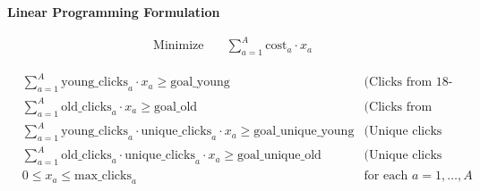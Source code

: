 \documentclass{article}
\begin{document}
\textbf{Linear Programming Formulation}

\begin{align*}
\text{Minimize} \quad & \sum_{a=1}^{A} \text{cost}_a \cdot x_a
\end{align*}

\begin{align*}
& \sum_{a=1}^{A} \text{young\_clicks}_a \cdot x_a \geq \text{goal\_young} & \text{(Clicks from 18-25)} \\
& \sum_{a=1}^{A} \text{old\_clicks}_a \cdot x_a \geq \text{goal\_old} & \text{(Clicks from 25+)} \\
& \sum_{a=1}^{A} \text{young\_clicks}_a \cdot \text{unique\_clicks}_a \cdot x_a \geq \text{goal\_unique\_young} & \text{(Unique clicks from 18-25)} \\
& \sum_{a=1}^{A} \text{old\_clicks}_a \cdot \text{unique\_clicks}_a \cdot x_a \geq \text{goal\_unique\_old} & \text{(Unique clicks from 25+)} \\
& 0 \leq x_a \leq \text{max\_clicks}_a & \text{for each } a = 1, \ldots, A
\end{align*}
\end{document}

